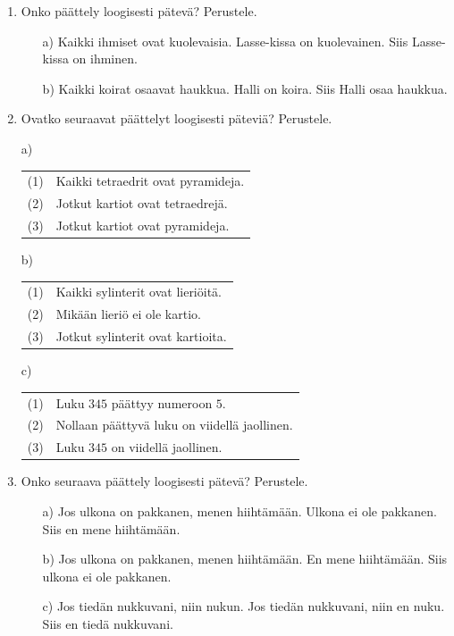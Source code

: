 \begin{enumerate}

\item Onko päättely loogisesti pätevä? Perustele.
\begin{itemize}
\item[a)]
Kaikki ihmiset ovat kuolevaisia. Lasse-kissa on kuolevainen. Siis Lasse-kissa on ihminen.
\item[b)]
Kaikki koirat osaavat haukkua. Halli on koira. Siis Halli osaa haukkua.
\end{itemize}

\item Ovatko seuraavat päättelyt loogisesti päteviä? Perustele.

a)  
\begin{tabular}{ll}
(1) & Kaikki tetraedrit ovat pyramideja.\\
 (2) & Jotkut kartiot ovat tetraedrejä.\\ \hline                            
 (3) & Jotkut kartiot ovat pyramideja.
\end{tabular}                                

b)  
\begin{tabular}{ll}
(1) & Kaikki sylinterit ovat lieriöitä.\\
 (2) & Mikään lieriö ei ole kartio. \\ \hline                            
 (3) & Jotkut sylinterit ovat kartioita. 
\end{tabular}                                

c)
\begin{tabular}{ll}
(1) & Luku $345$ päättyy numeroon $5$.\\
(2) & Nollaan päättyvä luku on viidellä jaollinen.\\ \hline
(3) & Luku $345$ on viidellä jaollinen.
\end{tabular}


\item Onko seuraava päättely loogisesti pätevä? Perustele.
\begin{itemize}
\item[a)] Jos ulkona on pakkanen, menen hiihtämään. Ulkona ei ole pakkanen. Siis en mene hiihtämään.
\item[b)] Jos ulkona on pakkanen, menen hiihtämään. En mene hiihtämään. Siis ulkona ei ole pakkanen.
\item[c)] Jos tiedän nukkuvani, niin nukun. Jos tiedän nukkuvani, niin en nuku. Siis en tiedä nukkuvani.
\end{itemize}



\end{enumerate}
